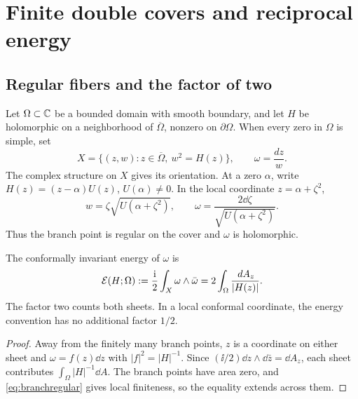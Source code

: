 \section{Finite double covers and reciprocal energy}\label{sec:geometry}

\subsection{Regular fibers and the factor of two}
Let $\Omega\subset\mathbb C$ be a bounded domain with smooth boundary, and let
$H$ be holomorphic on a neighborhood of $\overline\Omega$, nonzero on
$\partial\Omega$. When every zero in $\Omega$ is simple, set
\begin{equation}\label{eq:cover}
 X=\{(z,w):z\in\overline\Omega,\ w^2=H(z)\},\qquad
 \omega=\frac{dz}{w}.
\end{equation}
The complex structure on $X$ gives its orientation. At a zero $\alpha$,
write $H(z)=(z-\alpha)U(z)$, $U(\alpha)\ne0$. In the local coordinate
$z=\alpha+\zeta^2$,
\begin{equation}\label{eq:branchregular}
 w=\zeta\sqrt{U(\alpha+\zeta^2)},\qquad
 \omega=\frac{2\dd\zeta}{\sqrt{U(\alpha+\zeta^2)}}.
\end{equation}
Thus the branch point is regular on the cover and $\omega$ is holomorphic.

\begin{proposition}\label{prop:energy}
The conformally invariant energy of $\omega$ is
\begin{equation}\label{eq:energy}
 \mathcal E(H;\Omega):=\frac{\mathrm i}{2}\int_X\omega\wedge\bar\omega
       =2\int_\Omega\frac{\,d A_z}{|H(z)|}.
\end{equation}
The factor two counts both sheets. In a local conformal coordinate,
the energy convention has no additional factor $1/2$.
\end{proposition}
\begin{proof}
Away from the finitely many branch points, $z$ is a coordinate on either
sheet and $\omega=f(z)\dd z$ with $|f|^2=|H|^{-1}$.
Since $(\ii/2)\dd z\wedge\dd\bar z=\dd A_z$, each sheet contributes
$\int_\Omega |H|^{-1}\dd A$. The branch points have area zero, and
\eqref{eq:branchregular} gives local finiteness, so the equality extends
across them.
\end{proof}


